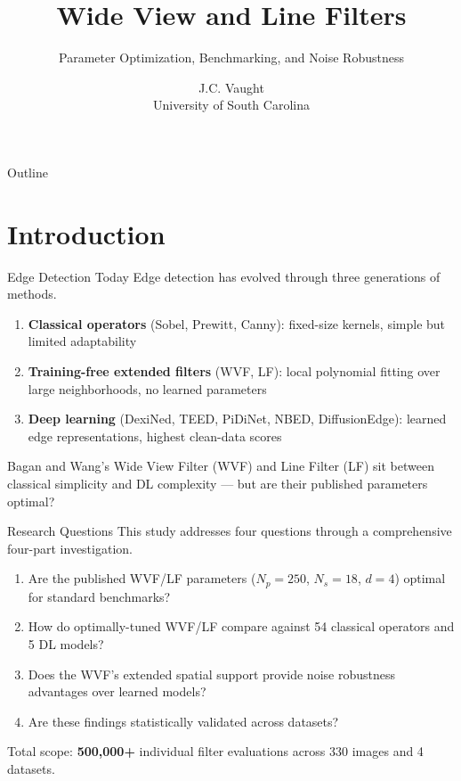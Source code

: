 \documentclass[10pt, aspectratio=169]{beamer}
\title[WVF/LF Edge Detection]{Wide View and Line Filters}
\subtitle{Parameter Optimization, Benchmarking, and Noise Robustness}
\author[J.C. Vaught]{J.C. Vaught\texorpdfstring{\\}{, }University of South Carolina}
\institute[UofSC]{}
\date{}
\begin{document}
{
  \begin{frame}[plain]
    \titlepage
  \end{frame}
}

\begin{frame}{Outline}
  \tableofcontents
\end{frame}

\section{Introduction}

\begin{frame}{Edge Detection Today}
  Edge detection has evolved through three generations of methods.

  \begin{enumerate}
    \item \textbf{Classical operators} (Sobel, Prewitt, Canny): fixed-size kernels, simple but limited adaptability
    \item \textbf{Training-free extended filters} (WVF, LF): local polynomial fitting over large neighborhoods, no learned parameters
    \item \textbf{Deep learning} (DexiNed, TEED, PiDiNet, NBED, DiffusionEdge): learned edge representations, highest clean-data scores
  \end{enumerate}

  \vspace{0.5em}
  Bagan and Wang's Wide View Filter (WVF) and Line Filter (LF) sit between classical simplicity and DL complexity --- but are their published parameters optimal?
\end{frame}

\begin{frame}{Research Questions}
  This study addresses four questions through a comprehensive four-part investigation.

  \begin{enumerate}
    \item Are the published WVF/LF parameters ($N_p = 250$, $N_s = 18$, $d = 4$) optimal for standard benchmarks?
    \item How do optimally-tuned WVF/LF compare against 54 classical operators and 5 DL models?
    \item Does the WVF's extended spatial support provide noise robustness advantages over learned models?
    \item Are these findings statistically validated across datasets?
  \end{enumerate}

  \vspace{0.5em}
  Total scope: \textbf{500,000+} individual filter evaluations across 330 images and 4 datasets.
\end{frame}
\end{document}
